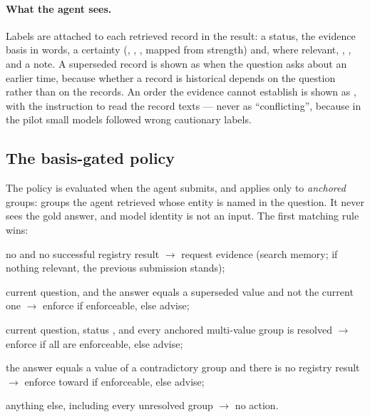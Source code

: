 \paragraph{What the agent sees.} Labels are attached to each retrieved record in the  result:
a status, the evidence basis in words, a certainty (, , ,
mapped from strength) and, where relevant, , ,  and a
note. A superseded record is shown as  when the question asks about an earlier time, because
whether a record is historical depends on the question rather than on the records. An order the evidence cannot
establish is shown as , with the instruction to read the record texts --- never as
``conflicting'', because in the pilot small models followed wrong cautionary labels.

\subsection{The basis-gated policy}

The policy is evaluated when the agent submits, and applies only to \emph{anchored} groups: groups the agent
retrieved whose entity is named in the question. It never sees the gold answer, and model identity is not an input.
The first matching rule wins:

\begin{description}[leftmargin=2.2em,itemsep=1pt,topsep=2pt,font=\normalfont\sffamily]
\item[P3] no  and no successful registry result $\rightarrow$ request evidence (search memory;
if nothing relevant, the previous submission stands);
\item[P1] current question, and the answer equals a superseded value and not the current one $\rightarrow$ enforce
if enforceable, else advise;
\item[P2] current question, status , and every anchored multi-value group is resolved $\rightarrow$
enforce if all are enforceable, else advise;
\item[P4] the answer equals a value of a contradictory group and there is no registry result $\rightarrow$ enforce
toward  if enforceable, else advise;
\item[--] anything else, including every unresolved group $\rightarrow$ no action.
\end{description}

